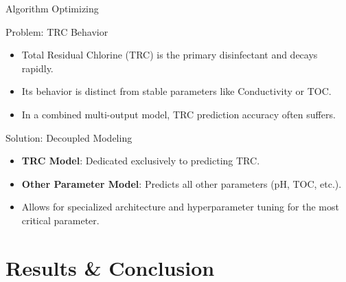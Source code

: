 \documentclass[xcolor=dvipsnames]{beamer}
\begin{document}
\begin{frame}{Algorithm Optimizing}
  \footnotesize
  \begin{block}{Problem: TRC Behavior}
      \begin{itemize}
          \item Total Residual Chlorine (TRC) is the primary disinfectant and decays rapidly.
          \item Its behavior is distinct from stable parameters like Conductivity or TOC.
          \item In a combined multi-output model, TRC prediction accuracy often suffers.
      \end{itemize}
  \end{block}
  \begin{block}{Solution: Decoupled Modeling}
      \begin{itemize}
          \item \textbf{TRC Model}: Dedicated exclusively to predicting TRC.
          \item \textbf{Other Parameter Model}: Predicts all other parameters (pH, TOC, etc.).
          \item Allows for specialized architecture and hyperparameter tuning for the most critical parameter.
      \end{itemize}
  \end{block}
\end{frame}

\section{Results \& Conclusion}
\end{document}
